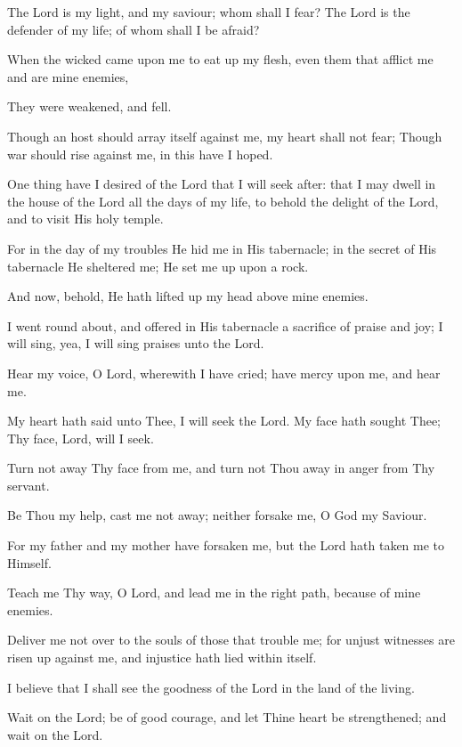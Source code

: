 The Lord is my light, and my saviour; whom shall I fear? The Lord is the defender of my life; of whom shall I be afraid?

When the wicked came upon me to eat up my flesh, even them that afflict me and are mine enemies,

They were weakened, and fell.

Though an host should array itself against me, my heart shall not fear; Though war should rise against me, in this have I hoped.

One thing have I desired of the Lord that I will seek after: that I may dwell in the house of the Lord all the days of my life, to behold the delight of the Lord, and to visit His holy temple.

For in the day of my troubles He hid me in His tabernacle; in the secret of His tabernacle He sheltered me; He set me up upon a rock.

And now, behold, He hath lifted up my head above mine enemies.

I went round about, and offered in His tabernacle a sacrifice of praise and joy; I will sing, yea, I will sing praises unto the Lord.

Hear my voice, O Lord, wherewith I have cried; have mercy upon me, and hear me.

My heart hath said unto Thee, I will seek the Lord. My face hath sought Thee; Thy face, Lord, will I seek.

Turn not away Thy face from me, and turn not Thou away in anger from Thy servant.

Be Thou my help, cast me not away; neither forsake me, O God my Saviour.

For my father and my mother have forsaken me, but the Lord hath taken me to Himself.

Teach me Thy way, O Lord, and lead me in the right path, because of mine enemies.

Deliver me not over to the souls of those that trouble me; for unjust witnesses are risen up against me, and injustice hath lied within itself.

I believe that I shall see the goodness of the Lord in the land of the living.

Wait on the Lord; be of good courage, and let Thine heart be strengthened; and wait on the Lord.
